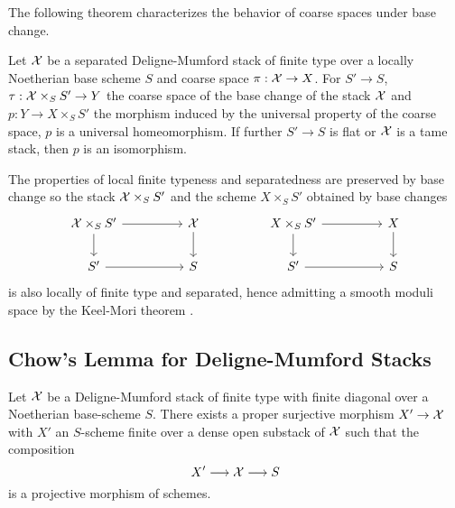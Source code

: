 The following theorem characterizes the behavior of coarse spaces under base change. 
\begin{theorem}\label{thm: coarse spaces under base change}
    Let $\mathcal{X}$ be a separated Deligne-Mumford stack of finite type over a locally Noetherian base scheme $S$ and coarse space $\pi:\mathcal{X}\to X$. For $S'\to S$, $\tau:\mathcal{X}\times_{S}S'\to Y$ the coarse space of the base change of the stack $\mathcal{X}$ and $p:Y\to X\times_{S}S'$ the morphism induced by the universal property of the coarse space, $p$ is a universal homeomorphism. If further $S'\to S$ is flat or $\mathcal{X}$ is a tame stack, then $p$ is an isomorphism. 
\end{theorem}
\begin{remark}
    The properties of local finite typeness and separatedness are preserved by base change so the stack $\mathcal{X}\times_{S}S'$ and the scheme $X\times_{S}S'$ obtained by base changes
    $$%
    \begin{tikzcd}
        {\Xcal\times_{S}S'} && \Xcal && {X\times_{S}S'} && X \\
        {S'} && S && {S'} && S
        \arrow[from=2-1, to=2-3]
        \arrow[from=1-1, to=1-3]
        \arrow[from=1-1, to=2-1]
        \arrow[from=1-3, to=2-3]
        \arrow[from=2-5, to=2-7]
        \arrow[from=1-7, to=2-7]
        \arrow[from=1-5, to=2-5]
        \arrow[from=1-5, to=1-7]
    \end{tikzcd}$$
    is also locally of finite type and separated, hence admitting a smooth moduli space by the Keel-Mori theorem . 
\end{remark}
\subsection{Chow's Lemma for Deligne-Mumford Stacks}\label{subsec: Chows lemma for DM stacks}
\begin{theorem}\label{thm: Chows lemma for stacks}
    Let $\mathcal{X}$ be a Deligne-Mumford stack of finite type with finite diagonal over a Noetherian base-scheme $S$. There exists a proper surjective morphism $X'\to\mathcal{X}$ with $X'$ an $S$-scheme finite over a dense open substack of $\mathcal{X}$ such that the composition 
    $$X'\longrightarrow\mathcal{X}\longrightarrow S$$
    is a projective morphism of schemes. 
\end{theorem}